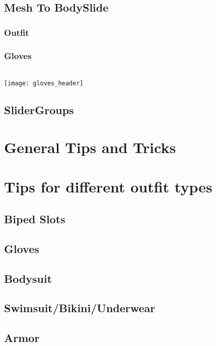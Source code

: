 \documentclass[12pt]{article}
\begin{document}
\subsection{Mesh To BodySlide}
\subsubsection{Outfit}

\pagebreak
\subsubsection{Gloves}
\\
\texttt{[image: gloves\_header]}
\pagebreak
\subsection{SliderGroups}

\pagebreak
\section{General Tips and Tricks}

\pagebreak
\section{Tips for different outfit types}
%
\subsection{Biped Slots}

\pagebreak
\subsection{Gloves}

\pagebreak
\subsection{Bodysuit}

\pagebreak
\subsection{Swimsuit/Bikini/Underwear}

\subsection{Armor}

\pagebreak
\end{document}
